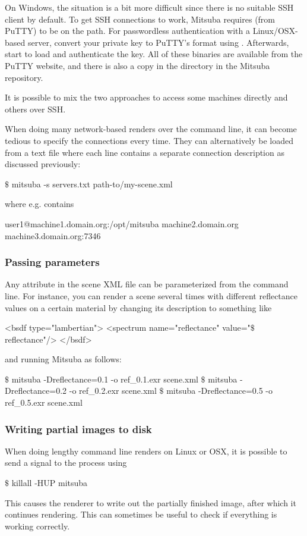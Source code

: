 \begin{itemize}
	On Windows, the situation is a bit more difficult since there is no suitable SSH client by
	default. To get SSH connections to work, Mitsuba requires  (from PuTTY) to
	be on the path. For passwordless authentication with a Linux/OSX-based
	server, convert your private key to PuTTY's format using .
	Afterwards, start  to load and  authenticate the key. All 
	of these binaries are available from the PuTTY website, and there is also
	a copy in the 
	directory in the Mitsuba repository.

	It is possible to mix the two approaches to access some machines directly and others
	over SSH.
\end{itemize}
When doing many network-based renders over the command line, it can become tedious to
specify the connections every time. They can alternatively be loaded from a text file
where each line contains a separate connection description as discussed previously:
\begin{shell}
$\texttt{\$}$ mitsuba -s servers.txt path-to/my-scene.xml
\end{shell}
where  e.g. contains
\begin{shell}
user1@machine1.domain.org:/opt/mitsuba
machine2.domain.org
machine3.domain.org:7346
\end{shell}
\subsubsection{Passing parameters}
Any attribute in the scene XML file can be parameterized from the
command line.
For instance, you can render a scene several times with different reflectance values
on a certain material by changing its description to something like 
\begin{xml}
<bsdf type="lambertian">
	<spectrum name="reflectance" value="$\texttt{\$}$reflectance"/>
</bsdf>
\end{xml}
and running Mitsuba as follows:
\begin{shell}
$\texttt{\$}$ mitsuba -Dreflectance=0.1 -o ref_0.1.exr scene.xml 
$\texttt{\$}$ mitsuba -Dreflectance=0.2 -o ref_0.2.exr scene.xml 
$\texttt{\$}$ mitsuba -Dreflectance=0.5 -o ref_0.5.exr scene.xml 
\end{shell}

\subsubsection{Writing partial images to disk}
When doing lengthy command line renders on Linux or OSX, it is possible 
to send a signal to the process using 
\begin{shell}	
$\texttt{\$}$ killall -HUP mitsuba
\end{shell}
This causes the renderer to write out the partially finished 
image, after which it continues rendering. This can sometimes be useful to 
check if everything is working correctly.

